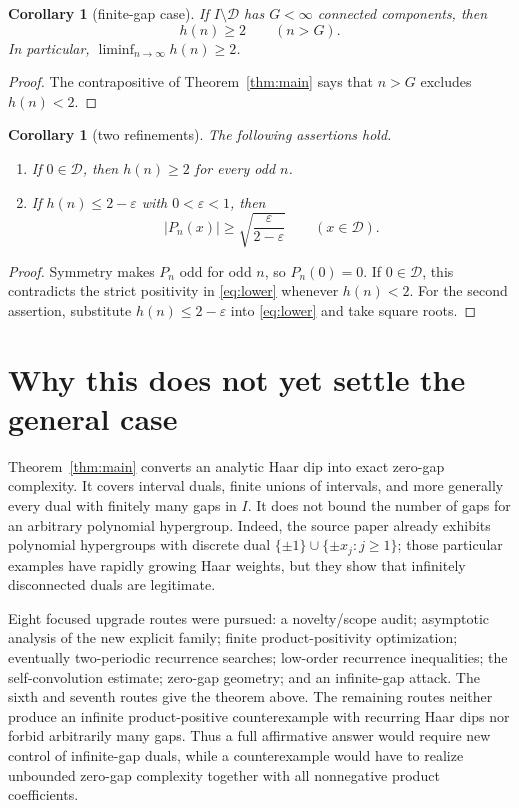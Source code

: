 \documentclass[11pt]{article}
\newtheorem{corollary}[theorem]{Corollary}
\newcommand{\D}{\mathcal D}
\begin{document}
\begin{corollary}[finite-gap case]\label{cor:finite}
If $I\setminus\D$ has $G<\infty$ connected components, then
\[
 h(n)\geq2\qquad(n>G).
\]
In particular, $\liminf_{n\to\infty}h(n)\geq2$.
\end{corollary}

\begin{proof}
The contrapositive of Theorem~\ref{thm:main} says that $n>G$ excludes
$h(n)<2$.
\end{proof}

\begin{corollary}[two refinements]\label{cor:refine}
The following assertions hold.
\begin{enumerate}
 \item If $0\in\D$, then $h(n)\geq2$ for every odd $n$.
 \item If $h(n)\leq2-\varepsilon$ with $0<\varepsilon<1$, then
 \[
  |P_n(x)|\geq\sqrt{\frac{\varepsilon}{2-\varepsilon}}
  \qquad(x\in\D).
 \]
\end{enumerate}
\end{corollary}

\begin{proof}
Symmetry makes $P_n$ odd for odd $n$, so $P_n(0)=0$.  If $0\in\D$, this
contradicts the strict positivity in \eqref{eq:lower} whenever $h(n)<2$.
For the second assertion, substitute $h(n)\leq2-\varepsilon$ into
\eqref{eq:lower} and take square roots.
\end{proof}

\section{Why this does not yet settle the general case}

Theorem~\ref{thm:main} converts an analytic Haar dip into exact zero-gap
complexity.  It covers interval duals, finite unions of intervals, and more
generally every dual with finitely many gaps in $I$.  It does not bound the
number of gaps for an arbitrary polynomial hypergroup.  Indeed, the source
paper already exhibits polynomial hypergroups with discrete dual
$\{\pm1\}\cup\{\pm x_j:j\geq1\}$; those particular examples have rapidly
growing Haar weights, but they show that infinitely disconnected duals are
legitimate.

Eight focused upgrade routes were pursued: a novelty/scope audit; asymptotic
analysis of the new explicit family; finite product-positivity optimization;
eventually two-periodic recurrence searches; low-order recurrence
inequalities; the self-convolution estimate; zero-gap geometry; and an
infinite-gap attack.  The sixth and seventh routes give the theorem above.
The remaining routes neither produce an infinite product-positive
counterexample with recurring Haar dips nor forbid arbitrarily many gaps.
Thus a full affirmative answer would require new control of infinite-gap
duals, while a counterexample would have to realize unbounded zero-gap
complexity together with all nonnegative product coefficients.
\end{document}
